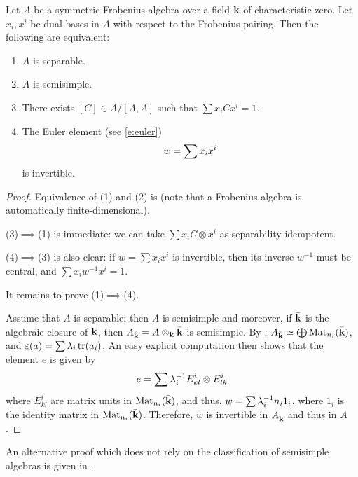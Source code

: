 \begin{theorem}\label{t:separable-frobenius}
  Let $A$ be a symmetric Frobenius algebra over a field $\mathbf{k}$ of characteristic
  zero. Let $x_i, x^i$ be dual bases in $A$ with respect to the Frobenius
  pairing. Then the following are equivalent:
  \begin{enumerate}
    \item $A$ is separable.
    \item $A$ is semisimple.
    \item There exists $[C]\in A/[A,A]$ such that $\sum x_iCx^i=1$.
    \item The Euler element \textup{(}see \eqref{e:euler}\textup{)}
      \begin{equation}\label{e:euler2}\index{Euler element}
        w=\sum x_ix^i
      \end{equation}
      is invertible.
  \end{enumerate}
\end{theorem}
\begin{proof}
  Equivalence of (1) and (2) is 
  (note that a Frobenius algebra is automatically finite-dimensional).

  (3)$\implies$(1) is immediate: we can take $\sum x_i C\otimes x^i$ as
  separability idempotent.

  (4)$\implies$(3) is also clear: if $w=\sum x_i x^i$ is invertible, then its
  inverse $w^{-1}$ must be central, and $\sum x_i w^{-1} x^i=1$.

  It remains to prove (1)$\implies$(4).

  Assume that $A$ is separable; then $A$ is semisimple and moreover, if
  $\bar {\mathbf{k}}$ is the algebraic closure of $\mathbf{k}$, then
  $A_{\bar {\mathbf{k}}}=A\otimes_{\mathbf{k}} \bar{\mathbf{k}}$ is semisimple. By
  , $A_{\bar{\mathbf{k}}}\simeq\bigoplus \operatorname{Mat}_{n_i}(\bar {\mathbf{k}})$,
  and $\varepsilon(a)=\sum \lambda_i \operatorname{tr}(a_i)$.
  An easy explicit computation then shows that the element $e$ is given by
  $$
    e = \sum \lambda_i^{-1}E^i_{kl}\otimes E^i_{lk}
  $$
  where $E^i_{kl}$ are matrix units in $\operatorname{Mat}_{n_i}(\bar {\mathbf{k}})$,
  and thus, $w=\sum \lambda_i^{-1} n_i 1_i$, where $1_i$ is the identity matrix in
  $\operatorname{Mat}_{n_i}(\bar {\mathbf{k}})$. Therefore, $w$ is invertible in $A_{\bar {\mathbf{k}}}$
  and thus in $A$.
\end{proof}
\begin{remark}
  An alternative proof which does not rely on the classification of
  semisimple algebras is given in \cite[Theorem 2.14]{lauda-pfeiffer}.
\end{remark}

